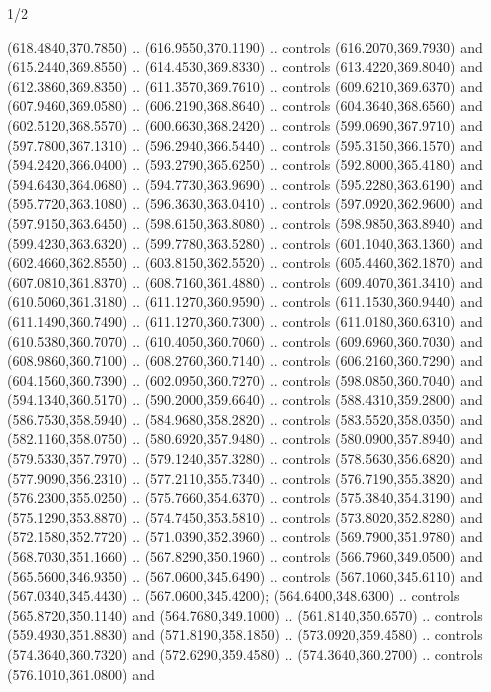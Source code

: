 \begin{flagdescription}{1/2}
\begin{scope}[xshift=0.5\flaglength,yshift=0.5\flagwidth,scale=\flagwidth/759]
\begin{scope}[y=0.8pt, x=0.8pt, yscale=-1,shift={(-720,-480)}]
\begin{scope}[cm={{1.14637,0.0,0.0,1.17117,(33.17849,82.1384)}}]
  (618.4840,370.7850) .. (616.9550,370.1190) .. controls (616.2070,369.7930) and
  (615.2440,369.8550) .. (614.4530,369.8330) .. controls (613.4220,369.8040) and
  (612.3860,369.8350) .. (611.3570,369.7610) .. controls (609.6210,369.6370) and
  (607.9460,369.0580) .. (606.2190,368.8640) .. controls (604.3640,368.6560) and
  (602.5120,368.5570) .. (600.6630,368.2420) .. controls (599.0690,367.9710) and
  (597.7800,367.1310) .. (596.2940,366.5440) .. controls (595.3150,366.1570) and
  (594.2420,366.0400) .. (593.2790,365.6250) .. controls (592.8000,365.4180) and
  (594.6430,364.0680) .. (594.7730,363.9690) .. controls (595.2280,363.6190) and
  (595.7720,363.1080) .. (596.3630,363.0410) .. controls (597.0920,362.9600) and
  (597.9150,363.6450) .. (598.6150,363.8080) .. controls (598.9850,363.8940) and
  (599.4230,363.6320) .. (599.7780,363.5280) .. controls (601.1040,363.1360) and
  (602.4660,362.8550) .. (603.8150,362.5520) .. controls (605.4460,362.1870) and
  (607.0810,361.8370) .. (608.7160,361.4880) .. controls (609.4070,361.3410) and
  (610.5060,361.3180) .. (611.1270,360.9590) .. controls (611.1530,360.9440) and
  (611.1490,360.7490) .. (611.1270,360.7300) .. controls (611.0180,360.6310) and
  (610.5380,360.7070) .. (610.4050,360.7060) .. controls (609.6960,360.7030) and
  (608.9860,360.7100) .. (608.2760,360.7140) .. controls (606.2160,360.7290) and
  (604.1560,360.7390) .. (602.0950,360.7270) .. controls (598.0850,360.7040) and
  (594.1340,360.5170) .. (590.2000,359.6640) .. controls (588.4310,359.2800) and
  (586.7530,358.5940) .. (584.9680,358.2820) .. controls (583.5520,358.0350) and
  (582.1160,358.0750) .. (580.6920,357.9480) .. controls (580.0900,357.8940) and
  (579.5330,357.7970) .. (579.1240,357.3280) .. controls (578.5630,356.6820) and
  (577.9090,356.2310) .. (577.2110,355.7340) .. controls (576.7190,355.3820) and
  (576.2300,355.0250) .. (575.7660,354.6370) .. controls (575.3840,354.3190) and
  (575.1290,353.8870) .. (574.7450,353.5810) .. controls (573.8020,352.8280) and
  (572.1580,352.7720) .. (571.0390,352.3960) .. controls (569.7900,351.9780) and
  (568.7030,351.1660) .. (567.8290,350.1960) .. controls (566.7960,349.0500) and
  (565.5600,346.9350) .. (567.0600,345.6490) .. controls (567.1060,345.6110) and
  (567.0340,345.4430) .. (567.0600,345.4200);
\path[fill=c6dbe45] %
  (564.6400,348.6300) .. controls (565.8720,350.1140) and
  (564.7680,349.1000) .. (561.8140,350.6570) .. controls (559.4930,351.8830) and
  (571.8190,358.1850) .. (573.0920,359.4580) .. controls (574.3640,360.7320) and
  (572.6290,359.4580) .. (574.3640,360.2700) .. controls (576.1010,361.0800) and

\end{scope}
\end{scope}
\end{scope}
\end{flagdescription}
